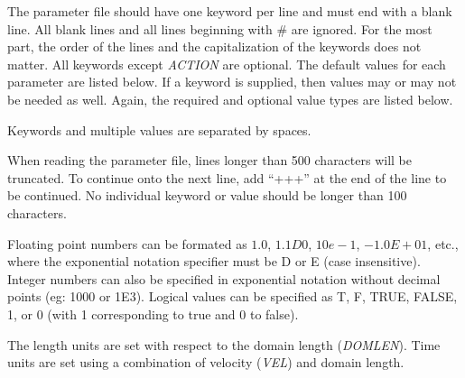 \documentclass[12pt]{article}
\begin{document}
The parameter file should have one keyword per line and must end with a blank line. All blank lines and all lines beginning with \# are ignored. For the most part, the order of the lines and the capitalization of the keywords does not matter. All keywords except {\em ACTION} are optional. The default values for each parameter are listed below. If a keyword is supplied, then values may or may not be needed as well. Again, the required and optional value types are listed below. 

Keywords and multiple values are separated by spaces. 

When reading the parameter file, lines longer than 500 characters will be truncated. To continue onto the next line, add ``+++'' at the end of the line to be continued.
No individual keyword or  value should be longer than 100 characters.

Floating point numbers can be formated as $1.0$, $1.1D0$, $10e-1$, $-1.0E+01$, etc., where the exponential notation specifier must be D or E (case insensitive). Integer numbers can also be specified in exponential notation without decimal points (eg: 1000 or 1E3). Logical values can be specified as T, F, TRUE, FALSE, 1, or 0 (with 1 corresponding to true and 0 to false).

The length units are set with respect to the domain length (\textit{DOMLEN}). Time units are set using a combination of velocity (\textit{VEL}) and domain length.
\end{document}
